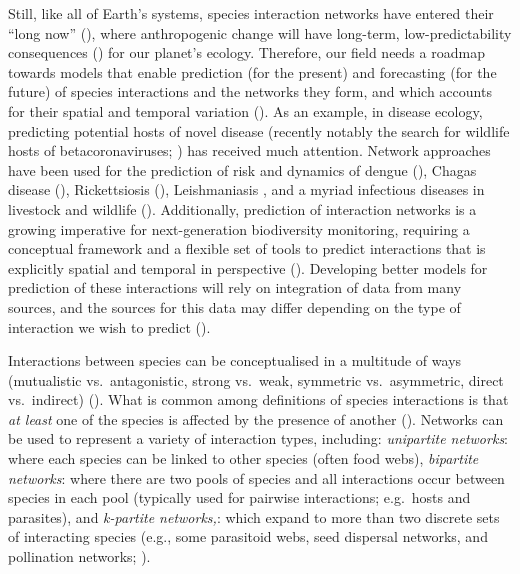 \begin{refsection}
Still, like all of Earth's systems, species interaction networks have
entered their ``long now'' (\cite{Carpenter2002EcoFut}), where
anthropogenic change will have long-term, low-predictability
consequences (\cite{Burkle2013PlaInt}) for our planet's ecology.
Therefore, our field needs a roadmap towards models that enable
prediction (for the present) and forecasting (for the future) of species
interactions and the networks they form, and which accounts for their
spatial and temporal variation (\cite{McCann2007Protecting, Seibold2018Necessity}). 
As an example, in disease ecology, predicting
potential hosts of novel disease (recently notably the search for
wildlife hosts of betacoronaviruses; \cite{Becker2020PreWil,
Wardeh2021Predicting}) has received much attention. Network approaches
have been used for the prediction of risk and dynamics of dengue
(\cite{Zhao2020MacLea}), Chagas disease (\cite{Rengifo-Correa2017UndTra}),
Rickettsiosis (\cite{Morand2020DisEco}), Leishmaniasis
\cite{Stephens2009UsiBio}, and a myriad infectious diseases in livestock
and wildlife (\cite{Craft2015InfDis}). Additionally, prediction of
interaction networks is a growing imperative for next-generation
biodiversity monitoring, requiring a conceptual framework and a flexible
set of tools to predict interactions that is explicitly spatial and
temporal in perspective (\cite{Edwards2021TroLan, Magioli2021DefLea,
Zhang2021PlaBre}). Developing better models for prediction of these
interactions will rely on integration of data from many sources, and the
sources for this data may differ depending on the type of interaction we
wish to predict (\cite{Gibb2021Data}).

Interactions between species can be conceptualised in a multitude of
ways (mutualistic vs.~antagonistic, strong vs.~weak, symmetric
vs.~asymmetric, direct vs.~indirect) (\cite{Jordano2016ChaEco,
Morales-Castilla2015Inferring}). What is common among definitions of
species interactions is that \emph{at least} one of the species is
affected by the presence of another (\cite{Morales-Castilla2015Inferring}).
Networks can be used to represent a variety of interaction types,
including: \emph{unipartite networks}: where each species can be linked
to other species (often food webs), \emph{bipartite networks}: where
there are two pools of species and all interactions occur between
species in each pool (typically used for pairwise interactions;
e.g.~hosts and parasites), and \emph{k-partite networks,}: which expand
to more than two discrete sets of interacting species (e.g., some
parasitoid webs, seed dispersal networks, and pollination networks;
\cite{Pocock2012RobRes}).


\end{refsection}
